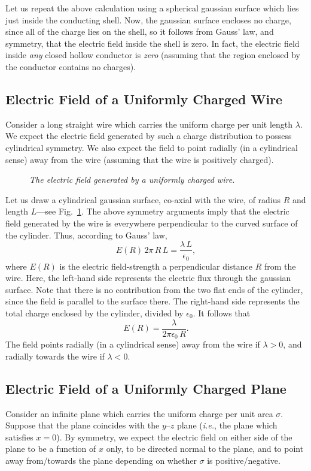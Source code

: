 Let us repeat the above calculation using a spherical gaussian surface which
lies just inside the conducting shell. Now, the
gaussian surface encloses no charge, since all of the charge lies on the
shell, so it follows from Gauss' law, and symmetry, that the
electric field inside the shell is zero. In fact, the electric field inside 
{\em any}\/ closed
hollow conductor is {\em zero}\/ (assuming that the region enclosed by the conductor
contains no charges). 

\subsection{Electric Field of a Uniformly Charged Wire}
Consider a long straight wire which carries the uniform
charge per unit length $\lambda$.
We expect the electric field generated by such a charge distribution
to possess cylindrical symmetry. We also expect the field to
point radially (in a cylindrical
sense) away from the wire (assuming that the wire is positively
charged).  

\begin{figure}[h]
\epsfysize=3.5in
\centerline{}
\caption{\em The electric field generated by a uniformly charged wire.}\label{f4.2a}
\end{figure}

Let us draw a cylindrical gaussian surface, co-axial with the wire, of radius
$R$ and length $L$---see Fig.~\ref{f4.2a}. The above symmetry arguments imply that the electric field generated by the wire is everywhere perpendicular
to the curved surface of the cylinder. Thus, according to Gauss' law,
\begin{equation}
E(R)\,2\pi \,R\, L = \frac{\lambda\, L}{\epsilon_0},
\end{equation}
where $E(R)$ is the electric field-strength a perpendicular distance $R$ from the wire. Here, the
left-hand side represents the electric flux through the gaussian surface.
Note that there is no contribution from the two flat ends of the cylinder, since the
field is parallel to the surface there. The right-hand side represents the
total charge enclosed by the cylinder, divided by $\epsilon_0$. It follows
that
\begin{equation}
E(R) = \frac{\lambda}{2\pi\epsilon_0\,R}.
\end{equation}
The field points radially (in a cylindrical sense) away from the wire
if $\lambda>0$, and radially towards the wire if $\lambda<0$. 

\subsection{Electric Field of a Uniformly Charged Plane}\label{s4.5}
Consider an infinite plane which carries the  uniform charge per unit area
$\sigma$. Suppose that the plane coincides with the 
$y$--$z$ plane ({\em i.e.}, the plane which satisfies $x=0$). 
By symmetry, we expect the electric field on either side of the plane to
be a function of $x$ only, to be directed
normal to the plane, and to point away from/towards the plane
depending on whether $\sigma$ is  positive/negative. 

